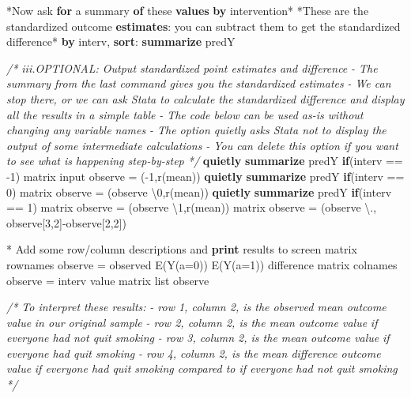 \documentclass[
  10pt,
]{book}
\newenvironment{Shaded}{\begin{snugshade}}{\end{snugshade}}
\newcommand{\CommentTok}[1]{\textcolor[rgb]{0.56,0.35,0.01}{\textit{#1}}}
\newcommand{\FunctionTok}[1]{\textcolor[rgb]{0.00,0.00,0.00}{#1}}
\newcommand{\KeywordTok}[1]{\textcolor[rgb]{0.13,0.29,0.53}{\textbf{#1}}}
\newcommand{\NormalTok}[1]{#1}
\newcommand{\OtherTok}[1]{\textcolor[rgb]{0.56,0.35,0.01}{#1}}
\begin{document}
\begin{Shaded}
\begin{Highlighting}[]
\NormalTok{*Now ask }\KeywordTok{for}\NormalTok{ a summary }\KeywordTok{of}\NormalTok{ these }\KeywordTok{values} \KeywordTok{by}\NormalTok{ intervention*}
\NormalTok{*These are the standardized outcome }\KeywordTok{estimates}\NormalTok{: you can subtract them to }\FunctionTok{get}\NormalTok{ the standardized difference*}
\KeywordTok{by}\NormalTok{ interv, }\KeywordTok{sort}\NormalTok{: }\KeywordTok{summarize}\NormalTok{ predY}

\CommentTok{/* iii.OPTIONAL: Output standardized point estimates and difference}
\CommentTok{{-} The summary from the last command gives you the }
\CommentTok{standardized estimates}
\CommentTok{{-} We can stop there, or we can ask Stata to calculate the }
\CommentTok{standardized difference and display all the results }
\CommentTok{in a simple table}
\CommentTok{{-} The code below can be used as{-}is without changing any}
\CommentTok{variable names}
\CommentTok{{-} The option \textasciigrave{}quietly\textasciigrave{} asks Stata not to display the output of }
\CommentTok{some intermediate calculations}
\CommentTok{{-} You can delete this option if you want to see what is }
\CommentTok{happening step{-}by{-}step */}
\KeywordTok{quietly} \KeywordTok{summarize}\NormalTok{ predY }\KeywordTok{if}\NormalTok{(interv == {-}1)}
\FunctionTok{matrix}\NormalTok{ input observe = ({-}1,}\OtherTok{\textasciigrave{}r(mean)\textquotesingle{}}\NormalTok{)}
\KeywordTok{quietly} \KeywordTok{summarize}\NormalTok{ predY }\KeywordTok{if}\NormalTok{(interv == 0)}
\FunctionTok{matrix}\NormalTok{ observe = (observe \textbackslash{}0,}\OtherTok{\textasciigrave{}r(mean)\textquotesingle{}}\NormalTok{)}
\KeywordTok{quietly} \KeywordTok{summarize}\NormalTok{ predY }\KeywordTok{if}\NormalTok{(interv == 1)}
\FunctionTok{matrix}\NormalTok{ observe = (observe \textbackslash{}1,}\OtherTok{\textasciigrave{}r(mean)\textquotesingle{}}\NormalTok{)}
\FunctionTok{matrix}\NormalTok{ observe = (observe \textbackslash{}., observe[3,2]{-}observe[2,2]) }

\NormalTok{* Add some }\OtherTok{row}\NormalTok{/column descriptions and }\KeywordTok{print}\NormalTok{ results to screen}
\FunctionTok{matrix} \OtherTok{rownames}\NormalTok{ observe = observed E(Y(a=0)) E(Y(a=1)) difference}
\FunctionTok{matrix} \OtherTok{colnames}\NormalTok{ observe = interv }\OtherTok{value}
\FunctionTok{matrix} \OtherTok{list}\NormalTok{ observe }

\CommentTok{/* To interpret these results:}
\CommentTok{{-} row 1, column 2, is the observed mean outcome value }
\CommentTok{in our original sample}
\CommentTok{{-} row 2, column 2, is the mean outcome value }
\CommentTok{if everyone had not quit smoking}
\CommentTok{{-} row 3, column 2, is the mean outcome value }
\CommentTok{if everyone had quit smoking}
\CommentTok{{-} row 4, column 2, is the mean difference outcome value }
\CommentTok{if everyone had quit smoking compared to if everyone }
\CommentTok{had not quit smoking */}


\end{Highlighting}
\end{Shaded}
\end{document}
